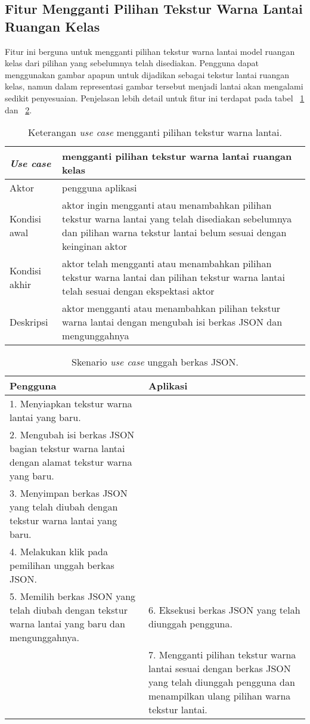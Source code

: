 \subsection{Fitur Mengganti Pilihan Tekstur Warna Lantai Ruangan Kelas}
Fitur ini berguna untuk mengganti pilihan tekstur warna lantai model ruangan kelas dari pilihan yang sebelumnya telah disediakan. Pengguna dapat menggunakan gambar apapun untuk dijadikan sebagai tekstur lantai ruangan kelas, namun dalam representasi gambar tersebut menjadi lantai akan mengalami sedikit penyesuaian. Penjelasan lebih detail untuk fitur ini terdapat pada tabel ~\ref{table:fiturpilihanteksturlantai1} dan ~\ref{table:fiturpilihanteksturlantai2}.
\begin{table}[H]
	\centering
	\begin{tabular}{| m{10em} | m{30em} |} 
	\hline
	\textbf{\textit{Use case}} & \textbf{mengganti pilihan tekstur warna lantai ruangan kelas} \\ 
	\hline
	Aktor & pengguna aplikasi  \\ 
	\hline
	Kondisi awal & aktor ingin mengganti atau menambahkan pilihan tekstur warna lantai yang telah disediakan sebelumnya dan pilihan warna tekstur lantai belum sesuai dengan keinginan aktor \\ 
	\hline
	Kondisi akhir & aktor telah mengganti atau menambahkan pilihan tekstur warna lantai dan pilihan tekstur warna lantai telah sesuai dengan ekspektasi aktor \\ 
 	\hline
	Deskripsi & aktor mengganti atau menambahkan pilihan tekstur warna lantai dengan mengubah isi berkas JSON dan mengunggahnya \\ 
 	\hline
	\end{tabular}
	\caption{Keterangan {\it use case} mengganti pilihan tekstur warna lantai.}
	\label{table:fiturpilihanteksturlantai1}
\end{table}

\begin{table}[H]
	\centering
	\begin{tabular}{| m{20em} | m{20em} |} 
	\hline
	\textbf{Pengguna} & \textbf{Aplikasi} \\ 
	\hline
	1. Menyiapkan tekstur warna lantai yang baru. &  \\ 
	\hline
	2. Mengubah isi berkas JSON bagian tekstur warna lantai dengan alamat tekstur warna yang baru. &  \\ 
	\hline
	3. Menyimpan berkas JSON yang telah diubah dengan tekstur warna lantai yang baru. &  \\ 
	\hline
	4. Melakukan klik pada pemilihan unggah berkas JSON. &  \\ 
	\hline
	5. Memilih berkas JSON yang telah diubah dengan tekstur warna lantai yang baru dan mengunggahnya. & 6. Eksekusi berkas JSON yang telah diunggah pengguna. \\ 
	\hline
	 & 7. Mengganti pilihan tekstur warna lantai sesuai dengan berkas JSON yang telah diunggah pengguna dan menampilkan ulang pilihan warna tekstur lantai. \\ 
 	\hline
	\end{tabular}
	\caption{Skenario {\it use case} unggah berkas JSON.}
	\label{table:fiturpilihanteksturlantai2}
\end{table}

